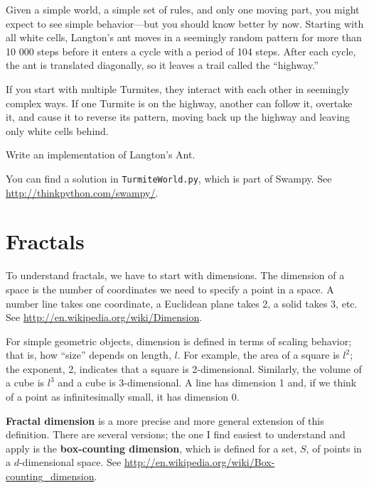\documentclass[10pt]{book}
\begin{document}
Given a simple world, a simple set of rules, and only one moving part,
you might expect to see simple behavior---but you should know
better by now.  Starting with all white cells, Langton's ant
moves in a seemingly random pattern for more than 10 000 steps
before it enters a cycle with a period of 104 steps.  After
each cycle, the ant is translated diagonally, so it leaves
a trail called the ``highway.''

If you start with multiple Turmites, they interact with each
other in seemingly complex ways.  If one Turmite is on the
highway, another can follow it, overtake it, and cause it to
reverse its pattern, moving back up the highway and leaving
only white cells behind.  

\begin{ex}

Write an implementation of Langton's Ant.

You can find a solution in {\tt TurmiteWorld.py}, which is
part of Swampy.  See \url{http://thinkpython.com/swampy/}.

\end{ex}




\chapter{Fractals}

To understand fractals, we have to start with dimensions.  The
dimension of a space is the number of coordinates we need to specify a
point in a space.  A number line takes one coordinate, a Euclidean
plane takes 2, a solid takes 3, etc.  See
\url{http://en.wikipedia.org/wiki/Dimension}.

For simple geometric objects, dimension is defined in terms of scaling
behavior; that is, how ``size'' depends on length, $l$.  For example,
the area of a square is $l^2$; the exponent, 2, indicates that a
square is 2-dimensional.  Similarly, the volume of a cube is $l^3$ and
a cube is 3-dimensional.  A line has dimension 1 and, if we think of a
point as infinitesimally small, it has dimension 0.

{\bf Fractal dimension} is a more precise and more general extension
of this definition.  There are several versions; the one I find
easiest to understand and apply is the {\bf box-counting dimension},
which is defined for a set, $S$, of points in a $d$-dimensional
space.  See \url{http://en.wikipedia.org/wiki/Box-counting_dimension}.
\end{document}
